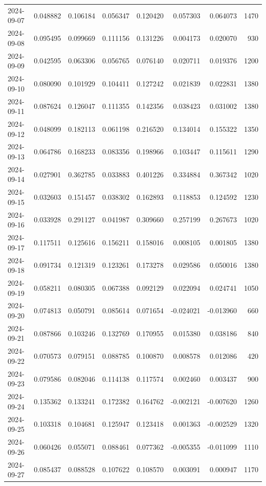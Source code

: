\begin{tabular}{lrrrrrrr}
2024-09-07 & 0.048882 & 0.106184 & 0.056347 & 0.120420 & 0.057303 & 0.064073 & 1470 \\
2024-09-08 & 0.095495 & 0.099669 & 0.111156 & 0.131226 & 0.004173 & 0.020070 & 930 \\
2024-09-09 & 0.042595 & 0.063306 & 0.056765 & 0.076140 & 0.020711 & 0.019376 & 1200 \\
2024-09-10 & 0.080090 & 0.101929 & 0.104411 & 0.127242 & 0.021839 & 0.022831 & 1380 \\
2024-09-11 & 0.087624 & 0.126047 & 0.111355 & 0.142356 & 0.038423 & 0.031002 & 1380 \\
2024-09-12 & 0.048099 & 0.182113 & 0.061198 & 0.216520 & 0.134014 & 0.155322 & 1350 \\
2024-09-13 & 0.064786 & 0.168233 & 0.083356 & 0.198966 & 0.103447 & 0.115611 & 1290 \\
2024-09-14 & 0.027901 & 0.362785 & 0.033883 & 0.401226 & 0.334884 & 0.367342 & 1020 \\
2024-09-15 & 0.032603 & 0.151457 & 0.038302 & 0.162893 & 0.118853 & 0.124592 & 1230 \\
2024-09-16 & 0.033928 & 0.291127 & 0.041987 & 0.309660 & 0.257199 & 0.267673 & 1020 \\
2024-09-17 & 0.117511 & 0.125616 & 0.156211 & 0.158016 & 0.008105 & 0.001805 & 1380 \\
2024-09-18 & 0.091734 & 0.121319 & 0.123261 & 0.173278 & 0.029586 & 0.050016 & 1380 \\
2024-09-19 & 0.058211 & 0.080305 & 0.067388 & 0.092129 & 0.022094 & 0.024741 & 1050 \\
2024-09-20 & 0.074813 & 0.050791 & 0.085614 & 0.071654 & -0.024021 & -0.013960 & 660 \\
2024-09-21 & 0.087866 & 0.103246 & 0.132769 & 0.170955 & 0.015380 & 0.038186 & 840 \\
2024-09-22 & 0.070573 & 0.079151 & 0.088785 & 0.100870 & 0.008578 & 0.012086 & 420 \\
2024-09-23 & 0.079586 & 0.082046 & 0.114138 & 0.117574 & 0.002460 & 0.003437 & 900 \\
2024-09-24 & 0.135362 & 0.133241 & 0.172382 & 0.164762 & -0.002121 & -0.007620 & 1260 \\
2024-09-25 & 0.103318 & 0.104681 & 0.125947 & 0.123418 & 0.001363 & -0.002529 & 1320 \\
2024-09-26 & 0.060426 & 0.055071 & 0.088461 & 0.077362 & -0.005355 & -0.011099 & 1110 \\
2024-09-27 & 0.085437 & 0.088528 & 0.107622 & 0.108570 & 0.003091 & 0.000947 & 1170 \\

\end{tabular}
